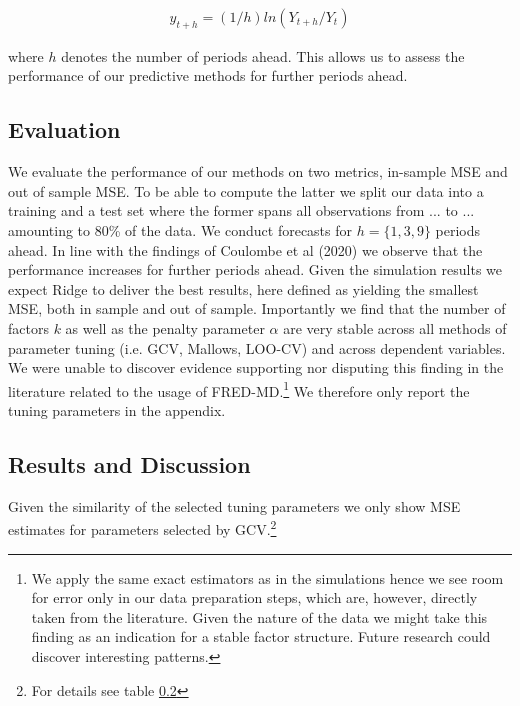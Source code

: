 \begin{align}
	y_{t+h} = (1/h) ln(Y_{t+h}/Y_t)
\end{align}

where $h$ denotes the number of periods ahead. This allows us to assess the performance of our predictive methods for further periods ahead.

\subsection{Evaluation}
We evaluate the performance of our methods on two metrics, in-sample MSE and out of sample MSE. To be able to compute the latter we split our data into a training and a test set where the former spans all observations from ... to ... amounting to 80\% of the data. We conduct forecasts for $h = \{1, 3, 9\}$ periods ahead. In line with the findings of Coulombe et al (2020) we observe that the performance increases for further periods ahead. Given the simulation results we expect Ridge to deliver the best results, here defined as yielding the smallest MSE, both in sample and out of sample. Importantly we find that the number of factors $k$ as well as the penalty parameter $\alpha$ are very stable across all methods of parameter tuning (i.e. GCV, Mallows, LOO-CV) and across dependent variables. We were unable to discover evidence supporting nor disputing this finding in the literature related to the usage of FRED-MD.\footnote{We apply the same exact estimators as in the simulations hence we see room for error only in our data preparation steps, which are, however, directly taken from the literature. Given the nature of the data we might take this finding as an indication for a stable factor structure. Future research could discover interesting patterns.} We therefore only report the tuning parameters in the appendix. 

\subsection{Results and Discussion}
Given the similarity of the selected tuning parameters we only show MSE estimates for parameters selected by GCV.\footnote{For details see table \ref{}}

